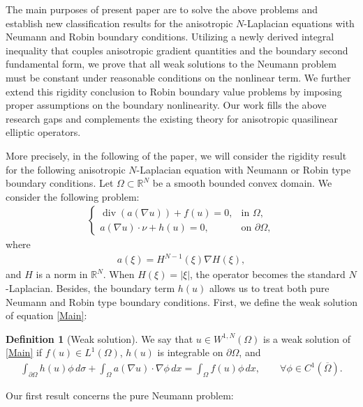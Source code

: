 \documentclass[reqno, 11pt]{amsart} %
\numberwithin{equation}{section}
\theoremstyle{definition}
\newtheorem{defn}[thm]{Definition}
\begin{document}
 The main purposes of present paper are to solve the above problems and establish new classification results for the anisotropic $N$-Laplacian equations with Neumann and Robin boundary conditions. Utilizing a newly derived integral inequality that couples anisotropic gradient quantities and the boundary second fundamental form, we prove that all weak solutions to the Neumann problem must be constant under reasonable conditions on the nonlinear term. We further extend this rigidity conclusion to Robin boundary value problems by imposing proper assumptions on the boundary nonlinearity. Our work fills the above research gaps and complements the existing theory for anisotropic quasilinear elliptic operators.

More precisely, in the following of the  paper,  we will consider the rigidity result for the following anisotropic $N$-Laplacian equation with Neumann or Robin type boundary conditions. Let $\Omega\subset\mathbb{R}^N$ be a smooth bounded convex domain. We consider  the following problem:
\begin{align}\label{Main}
    \begin{cases}
        \operatorname{div}(a(\nabla u))+f(u)=0,&\text{in }\Omega,\\
        a(\nabla u)\cdot\nu+h(u)=0,&\text{on }\partial\Omega,
    \end{cases}
\end{align}
where
   \begin{align*}
         a(\xi)=H^{N-1}(\xi)\nabla H(\xi),
   \end{align*}
and $H$ is a norm in $\mathbb{R}^N$. When $H(\xi)=|\xi|$, the operator becomes the standard $N$-Laplacian. Besides, the boundary term $h(u)$ allows us to treat both pure Neumann and Robin type boundary conditions. First, we define the weak solution of equation \eqref{Main}:

\begin{defn}[Weak solution]\label{def:weak-solution-main}
We say that $u\in W^{1,N}(\Omega)$ is a weak solution of \eqref{Main} if $f(u)\in L^1(\Omega)$, $h(u)$ is integrable on $\partial\Omega$, and
\begin{align}\label{weak-form}
        \int_{\partial\Omega} h(u)\phi\,d\sigma
        +\int_{\Omega} a(\nabla u)\cdot\nabla\phi\,dx
        =\int_{\Omega} f(u)\phi\,dx,
        \qquad \forall\phi\in C^1(\overline\Omega).
\end{align}
\end{defn}

Our first result concerns the pure Neumann problem:
\end{document}
